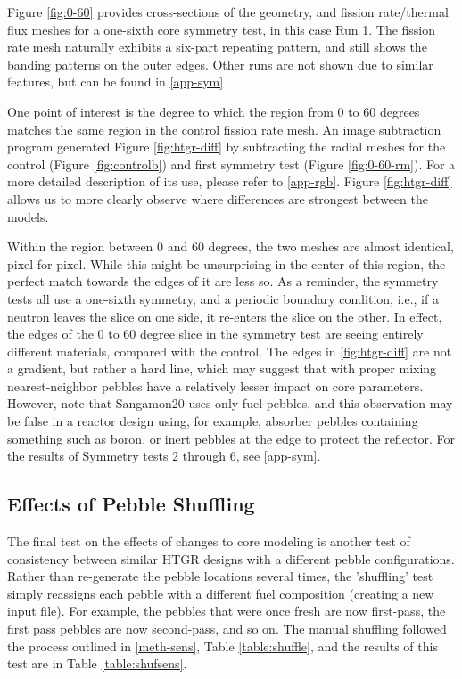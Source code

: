 Figure \ref{fig:0-60} provides cross-sections of the geometry, and fission rate/thermal flux meshes for a one-sixth core symmetry test, in this case Run 1.  The fission rate mesh naturally exhibits a six-part repeating pattern, and still shows the banding patterns on the outer edges.   Other runs are not shown due to similar features, but can be found in \autoref{app-sym}



One point of interest is the degree to which the region from 0 to 60 degrees matches the same region in the control fission rate mesh.  An image subtraction program generated Figure \ref{fig:htgr-diff} by subtracting the radial meshes for the control (Figure \ref{fig:controlb}) and first symmetry test (Figure \ref{fig:0-60-rm}).  For a more detailed description of its use, please refer to \autoref{app-rgb}.  Figure \ref{fig:htgr-diff} allows us to more clearly observe where differences are strongest between the models.



Within the region between 0 and 60 degrees, the two meshes are almost identical, pixel for pixel.  While this might be unsurprising in the center of this region, the perfect match towards the edges of it are less so.  As a reminder, the symmetry tests all use a one-sixth symmetry, and a periodic boundary condition, i.e., if a neutron leaves the slice on one side, it re-enters the slice on the other.  In effect, the edges of the 0 to 60 degree slice in the symmetry test are seeing entirely different materials, compared with the control.  The edges in \ref{fig:htgr-diff} are not a gradient, but rather a hard line, which may suggest that with proper mixing nearest-neighbor pebbles have a relatively lesser impact on core parameters.  However, note that Sangamon20 uses only fuel pebbles, and this observation may be false in a reactor design using, for example, absorber pebbles containing something such as boron, or inert pebbles at the edge to protect the reflector.  For the results of Symmetry tests 2 through 6, see \autoref{app-sym}.


\subsection{Effects of Pebble Shuffling}
\label{res-shuff}

The final test on the effects of changes to core modeling is another test of consistency between similar HTGR designs with a different pebble configurations.  Rather than re-generate the pebble locations several times, the 'shuffling' test simply reassigns each pebble with a different fuel composition (creating a new input file).  For example, the pebbles that were once fresh are now first-pass, the first pass pebbles are now second-pass, and so on.  The manual shuffling followed the process outlined in \autoref{meth-sens}, Table \ref{table:shuffle}, and the results of this test are in Table \ref{table:shufsens}.

